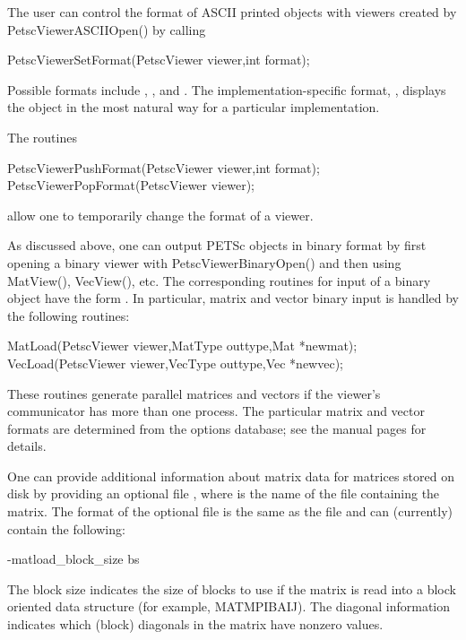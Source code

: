 {{{The user can control the format of ASCII printed objects with viewers
created by PetscViewerASCIIOpen() by calling
\begin{tabbing}
  PetscViewerSetFormat(PetscViewer viewer,int format);
\end{tabbing}
 
Possible formats include
, , and
.  The implementation-specific format,
, displays the object in the most natural way
for a particular implementation.

The routines
\begin{tabbing}
  PetscViewerPushFormat(PetscViewer viewer,int format);\\
  PetscViewerPopFormat(PetscViewer viewer);
\end{tabbing}
allow one to temporarily change the format of a viewer.

As discussed above, one can output PETSc objects in binary format by
first opening a binary viewer with PetscViewerBinaryOpen() and
then using MatView(), VecView(), etc.  The corresponding
routines for input of a binary object have the form .  In
particular, matrix and vector binary input is handled by the
following routines:
\begin{tabbing}
  MatLoad(PetscViewer viewer,MatType outtype,Mat *newmat);\\
  VecLoad(PetscViewer viewer,VecType outtype,Vec *newvec);
\end{tabbing}
These routines generate parallel matrices and vectors if the viewer's
communicator has more than one process.  The particular matrix and
vector formats are determined from the options database; see the
manual pages for details.

One can provide additional information about matrix data for matrices
stored on disk by providing an optional file ,
where  is the name of the file containing the matrix.
The format of the optional file is the same as the  file
and can (currently) contain the following:
\begin{tabbing}
   -matload\_block\_size \trl{<}bs\trl{>}
\end{tabbing}
The block size indicates the size of blocks to use if the matrix is
read into a block oriented data structure (for example,
MATMPIBAIJ). The diagonal information
 indicates
which (block) diagonals in the matrix have nonzero values.

}}}
